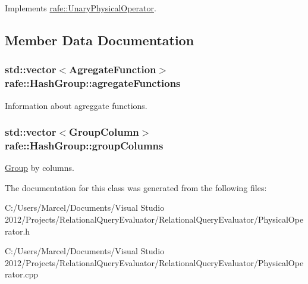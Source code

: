 Implements \hyperlink{classrafe_1_1_unary_physical_operator_a56a160698a78f8a0aa44e47e0804f45e}{rafe\+::\+Unary\+Physical\+Operator}.



\subsection{Member Data Documentation}
\hypertarget{classrafe_1_1_hash_group_a26ed49743b63ae86b803e9fe725e72c1}{
\subsubsection[{agregate\+Functions}]{\setlength{\rightskip}{0pt plus 5cm}std\+::vector$<${\bf Agregate\+Function}$>$ rafe\+::\+Hash\+Group\+::agregate\+Functions}}\label{classrafe_1_1_hash_group_a26ed49743b63ae86b803e9fe725e72c1}
Information about agreggate functions. \hypertarget{classrafe_1_1_hash_group_a440af6cd151c376aefb5385bbac54cb8}{
\subsubsection[{group\+Columns}]{\setlength{\rightskip}{0pt plus 5cm}std\+::vector$<${\bf Group\+Column}$>$ rafe\+::\+Hash\+Group\+::group\+Columns}}\label{classrafe_1_1_hash_group_a440af6cd151c376aefb5385bbac54cb8}
\hyperlink{classrafe_1_1_group}{Group} by columns. 

The documentation for this class was generated from the following files\+:\begin{DoxyCompactItemize}
\item 
C\+:/\+Users/\+Marcel/\+Documents/\+Visual Studio 2012/\+Projects/\+Relational\+Query\+Evaluator/\+Relational\+Query\+Evaluator/Physical\+Operator.\+h\item 
C\+:/\+Users/\+Marcel/\+Documents/\+Visual Studio 2012/\+Projects/\+Relational\+Query\+Evaluator/\+Relational\+Query\+Evaluator/Physical\+Operator.\+cpp\end{DoxyCompactItemize}
